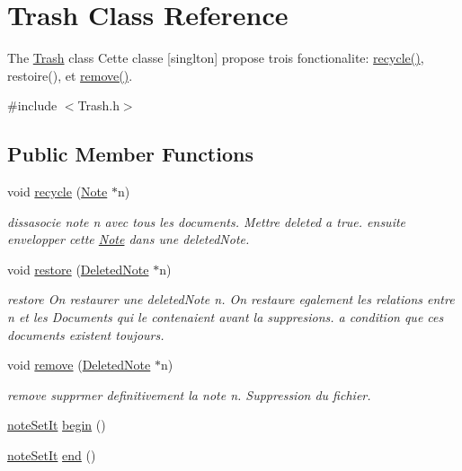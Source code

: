 \hypertarget{class_trash}{\section{Trash Class Reference}
\label{class_trash}
}


The \hyperlink{class_trash}{Trash} class Cette classe \mbox{[}singlton\mbox{]} propose trois fonctionalite\-: \hyperlink{class_trash_ac1c39fd789dde908deda27b9bda7882a}{recycle()}, restoire(), et \hyperlink{class_trash_a8e82eefa25891f59c40fd2a66b105694}{remove()}.  




{\ttfamily \#include $<$Trash.\-h$>$}

\subsection*{Public Member Functions}
\begin{DoxyCompactItemize}
\item 
void \hyperlink{class_trash_ac1c39fd789dde908deda27b9bda7882a}{recycle} (\hyperlink{class_note}{Note} $\ast$n)
\begin{DoxyCompactList}\small\item\em dissasocie note n avec tous les documents. Mettre deleted a true. ensuite envelopper cette \hyperlink{class_note}{Note} dans une deleted\-Note. \end{DoxyCompactList}\item 
void \hyperlink{class_trash_ad50ecc0402956a0289fd064026699cf8}{restore} (\hyperlink{class_deleted_note}{Deleted\-Note} $\ast$n)
\begin{DoxyCompactList}\small\item\em restore On restaurer une deleted\-Note n. On restaure egalement les relations entre n et les Documents qui le contenaient avant la suppresions. a condition que ces documents existent toujours. \end{DoxyCompactList}\item 
void \hyperlink{class_trash_a8e82eefa25891f59c40fd2a66b105694}{remove} (\hyperlink{class_deleted_note}{Deleted\-Note} $\ast$n)
\begin{DoxyCompactList}\small\item\em remove supprmer definitivement la note n. Suppression du fichier. \end{DoxyCompactList}\item 
\hyperlink{_trash_8h_abfa09246a693cbd2e785f18f8fdd86d5}{note\-Set\-It} \hyperlink{class_trash_ac47fc715f6a53ea167de2d95926bf192}{begin} ()
\item 
\hyperlink{_trash_8h_abfa09246a693cbd2e785f18f8fdd86d5}{note\-Set\-It} \hyperlink{class_trash_a7e9504a532d21c2b9d6840e4647568d8}{end} ()
\end{DoxyCompactItemize}
